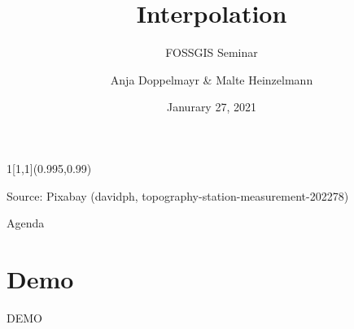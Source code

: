 \documentclass[aspectratio=169]{beamer}
\title{Interpolation}
\subtitle{FOSSGIS Seminar}
\date{Janurary 27, 2021}
\author{Anja Doppelmayr \& Malte Heinzelmann}
\institute{Ruprecht-Karls-Universit\"at Heidelberg}
\newlength\beamerleftmargin
\newenvironment*{env}{}{}
\begin{document}
	\begin{frame}[plain]
		\begin{textblock}{1}[1,1](0.995,0.99)
			\setlength\topsep{0pt}
			\begin{flushright}
				\tiny\color{background} Source: Pixabay (davidph, topography-station-measurement-202278)%
			\end{flushright}
		\end{textblock}
		\titlepage
	\end{frame}

	\begin{frame}{Agenda}
		\tableofcontents[]
	\end{frame}

	
	
	
	
	
	
	
	
	
	
	{
		\section{Demo}
		\begin{frame}[standout]
			\begin{env}
				\LARGE
				DEMO
			\end{env}
		\end{frame}
	}

	
	
\end{document}
